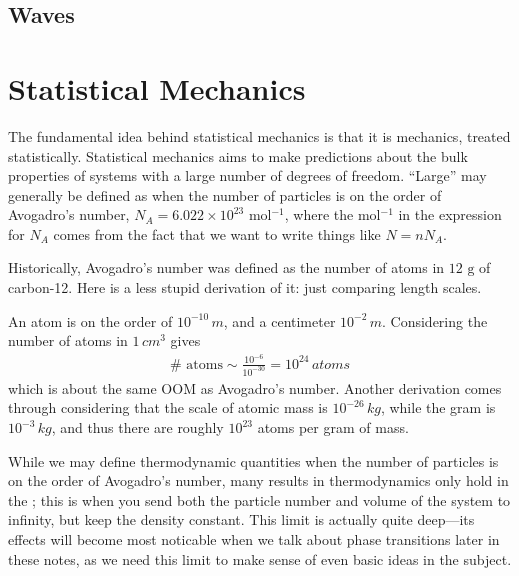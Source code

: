 \documentclass[11pt]{article}
\begin{document}
\subsection{Waves}

\newpage

\section{Statistical Mechanics}

The fundamental idea behind statistical mechanics is that it is
mechanics, treated statistically. Statistical mechanics aims to make 
predictions about the bulk properties of systems with a large number of 
degrees of freedom. ``Large'' may generally be defined as
when the number of particles is on the order of Avogadro's number,
$N_A = 6.022 \times 10^{23}$ mol$^{-1}$, where the mol$^{-1}$ in the 
expression for $N_A$ comes from the fact that we want to write things 
like $N = n N_A$.

\begin{reemark}
    Historically, Avogadro's number was defined as the number of atoms 
    in $12 \text{ g}$ of carbon-12. Here is a less stupid derivation of it: 
    just comparing length scales.

    An atom is on the order of $10^{-10} \, \unit{m}$, and a centimeter $10^{-2} \, \unit{m}$.
    Considering the number of atoms in $1 \, \unit{cm}^3$ gives
    \begin{align*}
        \# \text{ atoms} \sim \frac{10^{-6}}{10^{-30}} = 10^{24} \, \unit{atoms}
    \end{align*}
    which is about the same OOM as Avogadro's number. Another derivation
    comes through considering that the scale of atomic mass is $10^{-26} \, \unit{kg}$,
    while the gram is $10^{-3} \, \unit{kg}$, and thus there are roughly
    $10^{23}$ atoms per gram of mass.
\end{reemark}

While we may define thermodynamic quantities when
the number of particles is on the order of Avogadro's number, many results 
in thermodynamics only hold in the ; this is when you 
send both the particle number and volume of the system to infinity, but keep the density
constant. This limit is actually quite deep---its effects will become most noticable 
when we talk about phase transitions later in these notes, as we need this limit
to make sense of even basic ideas in the subject.
\end{document}
